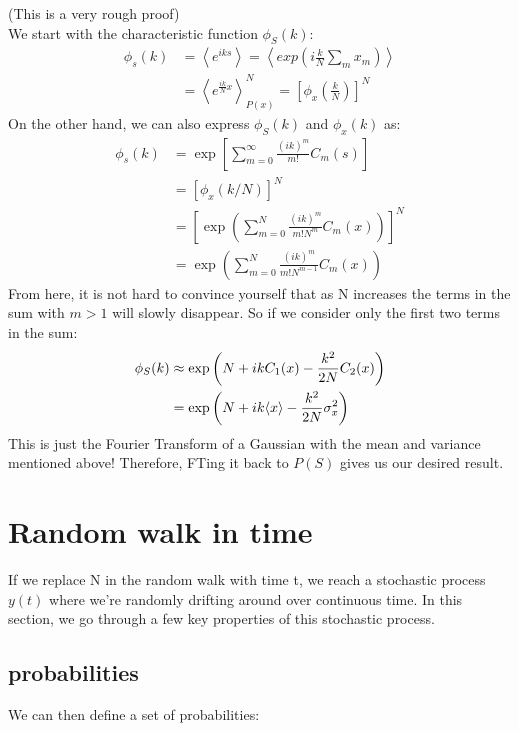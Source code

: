 \documentclass{report}
\begin{document}
\begin{myproof} (This is a very rough proof)\\
    We start with the characteristic function $\phi_S(k)$:
    \begin{align}
        \phi_s(k) & =\left\langle e^{i k s}\right\rangle=\left\langle exp\left(i \frac{k}{N} \sum_m x_m\right)\right\rangle \\
                  & =\left\langle e^{\frac{i k}{N} x}\right\rangle_{P(x)}^N = \left[\phi_x(\frac{k}{N})\right]^N
    \end{align}
    On the other hand, we can also express $\phi_S(k)$ and $\phi_x(k)$ as:
    \begin{align}
        \phi_s(k) & =\exp \left[\sum_{m=0}^{\infty} \frac{\left({i k}\right)^m}{m !} C_m(s)\right]           \\
                  & =\left[\phi_x(k / N)\right]^N                                                            \\
                  & =\left[\exp \left(\sum_{m=0}^N \frac{\left({i k}\right)^m}{m!N^m} C_m(x)\right)\right]^N \\
                  & =\exp \left(\sum_{m=0}^N \frac{(i k)^m}{m ! N^{m-1}} C_m(x)\right)
    \end{align}
    From here, it is not hard to convince yourself that as N increases the terms in the sum with $m>1$ will slowly disappear. So if we consider only the first two terms in the sum:
    \begin{align}
        \phi_S(k) & \approx \exp \left(N+i k C_1(x)-\frac{k^2}{2 N} C_2(x)\right) \\
                  & = \exp \left(N+i k \langle x \rangle - \frac{k^2}{2 N} \sigma_x^2\right)
    \end{align}
    This is just the Fourier Transform of a Gaussian with the mean and variance mentioned above! Therefore, FTing it back to $P(S)$ gives us our desired result.
\end{myproof}
\section{Random walk in time}
If we replace N in the random walk with time t, we reach a stochastic process $y(t)$ where we're randomly drifting around over continuous time. In this section, we go through a few key properties of this stochastic process.
\subsection{probabilities}
We can then define a set of probabilities:
\end{document}
